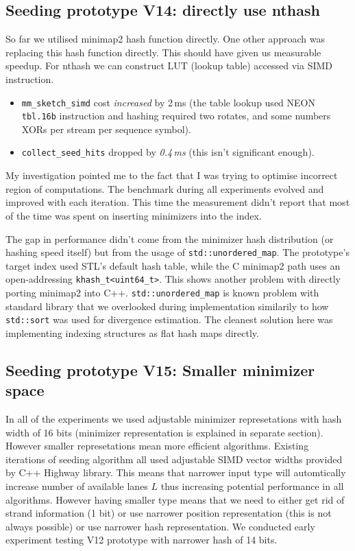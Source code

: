 \subsection{Seeding prototype V14: directly use nthash}

So far we utilised minimap2 hash function directly. One other approach was replacing this hash function directly. This should have given us measurable speedup. For nthash we can construct LUT (lookup table) accessed via SIMD instruction.

\begin{itemize}
\item \texttt{mm\_sketch\_simd} cost \emph{increased} by 2\,ms
  (the table lookup used NEON \texttt{tbl.16b} instruction and hashing required two rotates, and
  some numbers XORs per stream per sequence symbol).
\item \texttt{collect\_seed\_hits} dropped by \emph{0.4\,ms} (this isn't significant enough).
\end{itemize}

My investigation pointed me to the fact that I was trying to optimise incorrect region of computations. The benchmark during all experiments evolved and improved with each iteration. This time the measurement didn't report that
most of the time was spent on inserting minimizers into the index.

The gap in performance didn't come from the minimizer hash distribution (or hashing speed itself) but from the usage of \texttt{std::unordered\_map}.
The prototype's target index used STL's default hash table, while the C minimap2 path uses an open-addressing
\texttt{khash\_t<uint64\_t>}. This shows another problem with directly porting minimap2 into C++. \texttt{std::unordered\_map} is known problem with standard library that we overlooked during implementation similarily to how \texttt{std::sort} was used for divergence estimation.
The cleanest solution here was implementing indexing structures as flat hash maps directly.

\subsection{Seeding prototype V15: Smaller minimizer space}
\label{sec:v15-kmer-collapse-binary}

In all of the experiments we used adjustable minimizer represetations with hash width of 16 bits (minimizer representation is explained in separate section). However smaller represetations mean more efficient algorithms.
Existing iterations of seeding algorithm all used adjustable SIMD vector widths provided by C++ Highway library. This means that narrower input type will automtically increase number of available lanes $L$ thus increasing potential performance in all algorithms.
However having smaller type means that we need to either get rid of strand information (1 bit) or use narrower position representation (this is not always possible) or use narrower hash representation. 
We conducted early experiment testing V12 prototype with narrower hash of 14 bits.

